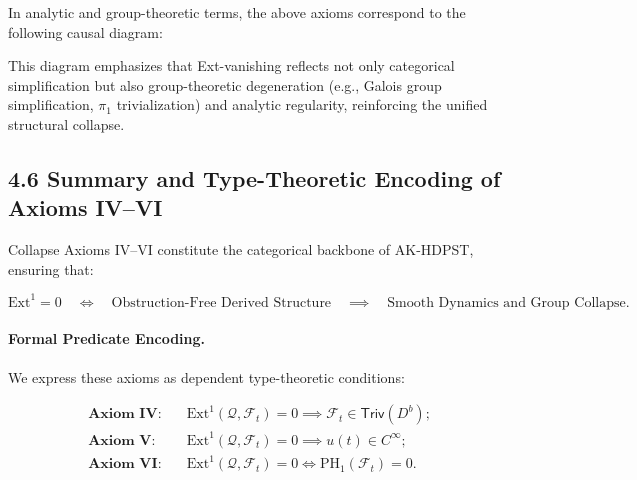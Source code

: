 \documentclass[11pt]{article}
\begin{document}
In analytic and group-theoretic terms, the above axioms correspond to the following causal diagram:


This diagram emphasizes that Ext-vanishing reflects not only categorical simplification but also group-theoretic degeneration (e.g., Galois group simplification, $\pi_1$ trivialization) and analytic regularity, reinforcing the unified structural collapse.

\subsection*{4.6 Summary and Type-Theoretic Encoding of Axioms IV–VI}

Collapse Axioms IV–VI constitute the categorical backbone of AK-HDPST, ensuring that:

\[
\mathrm{Ext}^1 = 0 \quad \Longleftrightarrow \quad \text{Obstruction-Free Derived Structure} \quad \implies \quad \text{Smooth Dynamics and Group Collapse}.
\]

\paragraph{Formal Predicate Encoding.}

We express these axioms as dependent type-theoretic conditions:

\begin{align*}
\textbf{Axiom IV:} &\quad \mathrm{Ext}^1(\mathcal{Q}, \mathcal{F}_t) = 0 \implies \mathcal{F}_t \in \mathsf{Triv}(D^b); \\
\textbf{Axiom V:} &\quad \mathrm{Ext}^1(\mathcal{Q}, \mathcal{F}_t) = 0 \implies u(t) \in C^\infty; \\
\textbf{Axiom VI:} &\quad \mathrm{Ext}^1(\mathcal{Q}, \mathcal{F}_t) = 0 \iff \mathrm{PH}_1(\mathcal{F}_t) = 0.
\end{align*}
\end{document}
